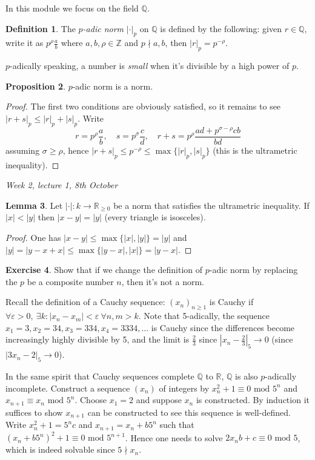 \documentclass{article}
\newcommand{\Z}{\mathbb{Z}}
\newcommand{\Q}{\mathbb{Q}}
\newcommand{\R}{\mathbb{R}}
\newcommand{\Mod}{\text{ mod }}
\theoremstyle{definition}
\newtheorem{defn}{Definition}[subsection]
\newtheorem{prop}[defn]{Proposition}
\newtheorem{lemma}[defn]{Lemma}
\newtheorem{exe}[defn]{Exercise}
\begin{document}
In this module we focus on the field $\Q$.
\begin{defn}
The $p$\textit{-adic norm} $|\cdot|_p$ on $\Q$ is defined by the following: given $r\in\Q$, write it as $p^\rho \frac{a}{b}$ where $a,b,\rho\in\Z$ and $p\nmid a,b$, then $|r|_p=p^{-\rho}$.
\end{defn}

$p$-adically speaking, a number is \textit{small} when it's divisible by a high power of $p$.

\begin{prop}
$p$-adic norm is a norm.
\end{prop}
\begin{proof}
The first two conditions are obviously satisfied, so it remains to see $|r+s|_p\leq |r|_p+|s|_p$. Write
\[
r=p^\rho \frac{a}{b},\quad s=p^\sigma\frac{c}{d},\quad r+s=p^\rho\frac{ad+p^{\sigma-\rho}cb}{bd}
\]
assuming $\sigma\geq\rho$, hence $|r+s|_p\leq p^{-\rho}\leq \max\{|r|_p,|s|_p\}$ (this is the ultrametric inequality).
\end{proof}

\begin{flushright}
\textit{Week 2, lecture 1, 8th October}
\end{flushright}

\begin{lemma}
\label{lemma:isosceles}
Let $|\cdot|:k\rightarrow \R_{\geq 0}$ be a norm that satisfies the ultrametric inequality. If $|x|<|y|$ then $|x-y|=|y|$ (every triangle is isosceles).
\end{lemma}
\begin{proof}
One has $|x-y|\leq \max\{|x|,|y|\}=|y|$ and $|y|=|y-x+x|\leq \max\{|y-x|,|x|\}=|y-x|$.
\end{proof}

\begin{exe}
Show that if we change the definition of $p$-adic norm by replacing the $p$ be a composite number $n$, then it's not a norm.
\end{exe}

Recall the definition of a Cauchy sequence: $(x_n)_{n\geq 1}$ is Cauchy if $\forall\varepsilon>0,\ \exists k:|x_n-x_m|<\varepsilon\ \forall n,m>k$. Note that 5-adically, the sequence $x_1=3,x_2=34,x_3=334,x_4=3334,\ldots$ is Cauchy since the differences become increasingly highly divisible by 5, and the limit is $\frac23$ since $\left|x_n-\frac23\right|_5\rightarrow 0$ (since $|3x_n-2|_5\rightarrow 0$).

In the same spirit that Cauchy sequences complete $\Q$ to $\R$, $\Q$ is also $p$-adically incomplete. Construct a sequence $(x_n)$ of integers by $x_n^2+1\equiv 0\Mod 5^n$ and $x_{n+1}\equiv x_n\Mod 5^n$. Choose $x_1=2$ and suppose $x_n$ is constructed. By induction it suffices to show $x_{n+1}$ can be constructed to see this sequence is well-defined. Write $x_n^2+1=5^nc$ and $x_{n+1}=x_n+b5^n$ such that $(x_n+b5^n)^2+1\equiv 0\Mod 5^{n+1}$. Hence one needs to solve $2x_nb+c\equiv 0\Mod 5$, which is indeed solvable since $5\nmid x_n$.
\end{document}
